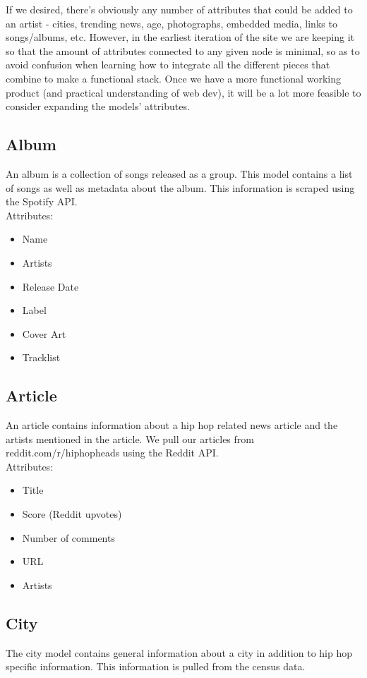 \documentclass{scrartcl}
\begin{document}
If we desired, there’s obviously any number of attributes that could be added to an artist - cities, trending news, age, photographs, embedded media, links to songs/albums, etc. However, in the earliest iteration of the site we are keeping it so that the amount of attributes connected to any given node is minimal, so as to avoid confusion when learning how to integrate all the different pieces that combine to make a functional stack. Once we have a more functional working product (and practical understanding of web dev), it will be a lot more feasible to consider expanding the models’ attributes. 

\subsection{Album}
An album is a collection of songs released as a group. This model contains a list of songs as well as metadata about the album. This information is scraped using the Spotify API.\\

Attributes:
\begin{itemize}
    \item Name
    \item Artists
    \item Release Date
    \item Label
    \item Cover Art
    \item Tracklist
\end{itemize}

\subsection{Article}
An article contains information about a hip hop related news article and the artists mentioned in the article. We pull our articles from reddit.com/r/hiphopheads using the Reddit API.\\

Attributes:
\begin{itemize}
    \item Title
    \item Score (Reddit upvotes)
    \item Number of comments
    \item URL
    \item Artists
\end{itemize}

\subsection{City}
The city model contains general information about a city in addition to hip hop specific information. This information is pulled from the census data.\\
\end{document}
